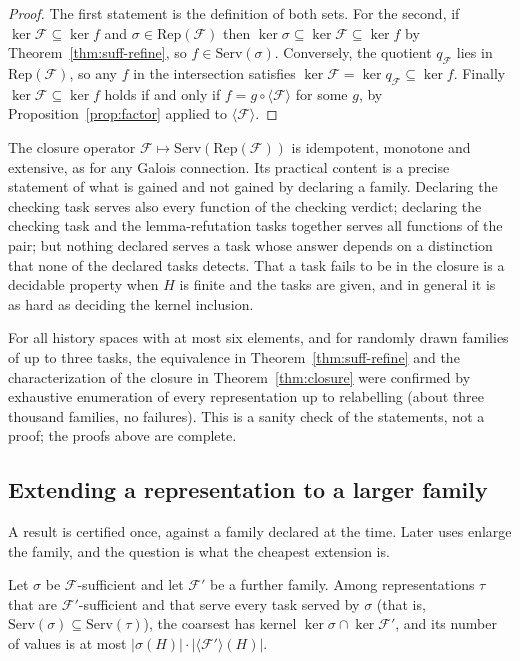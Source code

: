 \begin{proof}
The first statement is the definition of both sets. For the second, if $\ker\mathcal F\subseteq\ker f$ and $\sigma\in\mathrm{Rep}(\mathcal F)$ then $\ker\sigma\subseteq\ker\mathcal F\subseteq\ker f$ by Theorem~\ref{thm:suff-refine}, so $f\in\mathrm{Serv}(\sigma)$. Conversely, the quotient $q_{\mathcal F}$ lies in $\mathrm{Rep}(\mathcal F)$, so any $f$ in the intersection satisfies $\ker\mathcal F=\ker q_{\mathcal F}\subseteq\ker f$. Finally $\ker\mathcal F\subseteq\ker f$ holds if and only if $f=g\circ\langle\mathcal F\rangle$ for some $g$, by Proposition~\ref{prop:factor} applied to $\langle\mathcal F\rangle$.
\end{proof}

The closure operator $\mathcal F\mapsto\mathrm{Serv}(\mathrm{Rep}(\mathcal F))$ is idempotent, monotone and extensive, as for any Galois connection. Its practical content is a precise statement of what is gained and not gained by declaring a family. Declaring the checking task serves also every function of the checking verdict; declaring the checking task and the lemma-refutation tasks together serves all functions of the pair; but nothing declared serves a task whose answer depends on a distinction that none of the declared tasks detects. That a task fails to be in the closure is a decidable property when $H$ is finite and the tasks are given, and in general it is as hard as deciding the kernel inclusion.

\begin{remark}
For all history spaces with at most six elements, and for randomly drawn families of up to three tasks, the equivalence in Theorem~\ref{thm:suff-refine} and the characterization of the closure in Theorem~\ref{thm:closure} were confirmed by exhaustive enumeration of every representation up to relabelling (about three thousand families, no failures). This is a sanity check of the statements, not a proof; the proofs above are complete.
\end{remark}

\subsection*{Extending a representation to a larger family}

A result is certified once, against a family declared at the time. Later uses enlarge the family, and the question is what the cheapest extension is.

\begin{proposition}
\label{prop:extend}
Let $\sigma$ be $\mathcal F$-sufficient and let $\mathcal F'$ be a further family. Among representations $\tau$ that are $\mathcal F'$-sufficient and that serve every task served by $\sigma$ (that is, $\mathrm{Serv}(\sigma)\subseteq\mathrm{Serv}(\tau)$), the coarsest has kernel $\ker\sigma\cap\ker\mathcal F'$, and its number of values is at most $|\sigma(H)|\cdot|\langle\mathcal F'\rangle(H)|$.
\end{proposition}

